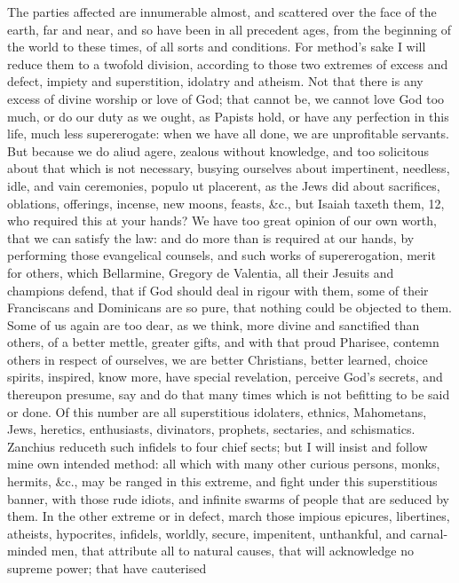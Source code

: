 {The parties affected are innumerable almost, and scattered over the
face of the earth, far and near, and so have been in all precedent
ages, from the beginning of the world to these times, of all sorts and
conditions. For method's sake I will reduce them to a twofold division,
according to those two extremes of excess and defect, impiety and
superstition, idolatry and atheism. Not that there is any excess of
divine worship or love of God; that cannot be, we cannot love God too
much, or do our duty as we ought, as Papists hold, or have any
perfection in this life, much less supererogate: when we have all done,
we are unprofitable servants. But because we do aliud agere, zealous
without knowledge, and too solicitous about that which is not
necessary, busying ourselves about impertinent, needless, idle, and
vain ceremonies, populo ut placerent, as the Jews did about sacrifices,
oblations, offerings, incense, new moons, feasts, \&c., but Isaiah
taxeth them,  12, who required this at your hands? We have too great
opinion of our own worth, that we can satisfy the law: and do more than
is required at our hands, by performing those evangelical counsels, and
such works of supererogation, merit for others, which Bellarmine,
Gregory de Valentia, all their Jesuits and champions defend, that if
God should deal in rigour with them, some of their Franciscans and
Dominicans are so pure, that nothing could be objected to them. Some of
us again are too dear, as we think, more divine and sanctified than
others, of a better mettle, greater gifts, and with that proud
Pharisee, contemn others in respect of ourselves, we are better
Christians, better learned, choice spirits, inspired, know more, have
special revelation, perceive God's secrets, and thereupon presume, say
and do that many times which is not befitting to be said or done. Of
this number are all superstitious idolaters, ethnics, Mahometans, Jews,
heretics, enthusiasts, divinators, prophets, sectaries, and
schismatics. Zanchius reduceth such infidels to four chief sects; but I
will insist and follow mine own intended method: all which with many
other curious persons, monks, hermits, \&c., may be ranged in this
extreme, and fight under this superstitious banner, with those rude
idiots, and infinite swarms of people that are seduced by them. In the
other extreme or in defect, march those impious epicures, libertines,
atheists, hypocrites, infidels, worldly, secure, impenitent,
unthankful, and carnal-minded men, that attribute all to natural
causes, that will acknowledge no supreme power; that have cauterised
}
